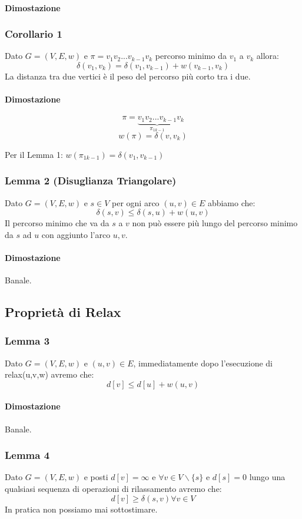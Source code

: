 \paragraph{Dimostazione}
\blindtext

\subsubsection{Corollario 1}
Dato $G=(V,E,w)$ e $\pi=v_1v_2...v_{k-1}v_k$ percorso minimo da $v_1$ a $v_k$ allora:
$$ \delta(v_1,v_k) = \delta(v_1,v_{k-1})+w(v_{k-1},v_k) $$
La distanza tra due vertici è il peso del percorso più corto tra i due.

\paragraph{Dimostazione}
$$ \pi = \underbrace{v_1v_2...v_{k-1}}_{\pi_{1 k-1}}v_k$$
$$ w(\pi) = \delta(v,v_k)$$
\begin{center}
    Per il Lemma 1: $ w(\pi_{1 k-1}) = \delta(v_1,v_{k-1})$    
\end{center}

\subsubsection{Lemma 2 (Disuglianza Triangolare)}
Dato $G=(V,E,w)$ e $s \in V$ per ogni arco $(u,v) \in E$ abbiamo che:
$$ \delta(s,v) \le \delta(s,u)+w(u,v) $$
Il percorso minimo che va da $s$ a $v$ non può essere più lungo del percorso minimo da $s$ ad $u$ con aggiunto l'arco $u,v$.
\paragraph{Dimostazione} Banale.

\subsection{Proprietà di Relax}
\subsubsection{Lemma 3}
Dato  $G=(V,E,w)$ e $(u,v) \in E$, immediatamente dopo l'esecuzione di relax(u,v,w) avremo che:
$$ d[v] \le d[u]+w(u,v)$$
\paragraph{Dimostazione} Banale.

\subsubsection{Lemma 4}
Dato  $G=(V,E,w)$ e posti $d[v]=\infty$ e $\forall v \in V \backslash\{s\}$ e $d[s]=0$ lungo una qualsiasi sequenza di operazioni di rilassamento avremo che:
$$ d[v] \ge \delta(s,v) \forall v \in V$$
In pratica non possiamo mai sottostimare.

